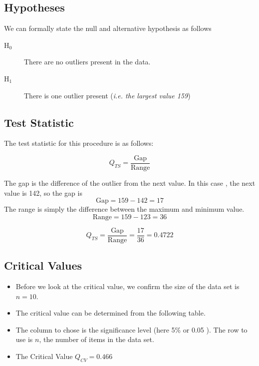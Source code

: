 \documentclass[a4paper,12pt]{article}
\begin{document}
\subsection*{Hypotheses}

We can formally state the null and alternative hypothesis as follows

\begin{description}
\item[H$_0$] There are no outliers present in the data.
\item[H$_1$] There is one outlier present (\textit{i.e. the largest value 159})
\end{description}

\subsection*{Test Statistic}

The test statistic for this procedure is as follows:

\[ Q_{TS} =  \frac{\mbox{Gap}}{\mbox{Range}} \]

\noindent The gap is the difference of the outlier from the next value. In this case , the next value is 142, so the gap is 
\[ \mbox{Gap} = 159 - 142 = 17\]
The range is simply the difference between the maximum and minimum value.
\[ \mbox{Range} =  159-123 =36\]

\[ Q_{TS} =  \frac{\mbox{Gap}}{\mbox{Range}} = \frac{17}{36} = 0.4722 \]

\subsection*{Critical Values}

\begin{itemize}
    \item Before we look at the critical value, we confirm the size of the data set is $n=10$.

\item The critical value can be determined from the following table. 

\item  The column to chose is the significance level (here 5\% or 0.05 ). The row to use is $n$, the number of items in the data set.

\item The Critical Value $Q_{CV} = 0.466$
\end{itemize}
\end{document}
